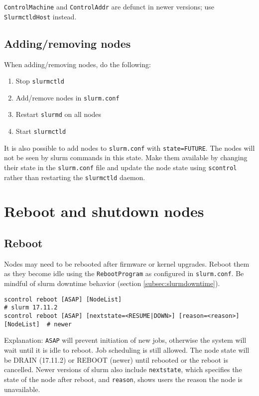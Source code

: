 \texttt{ControlMachine} and \texttt{ControlAddr} are defunct in newer versions; use \texttt{SlurmctldHost} instead.

\subsection{Adding/removing nodes} \label{subsec:addnodes}

When adding/removing nodes, do the following:
\begin{enumerate}
\item Stop \texttt{slurmctld}
\item Add/remove nodes in \texttt{slurm.conf}
\item Restart \texttt{slurmd} on all nodes
\item Start \texttt{slurmctld}
\end{enumerate}

\noindent It is also possible to add nodes to \texttt{slurm.conf} with \texttt{state=FUTURE}. The nodes will not be seen by slurm commands in this state. Make them available by changing their state in the \texttt{slurm.conf} file and update the node state using \texttt{scontrol} rather than restarting the \texttt{slurmctld} daemon.

\section{Reboot and shutdown nodes} \label{sec:slurmpowercycle}

\subsection{Reboot} \label{subsec:slurmreboot}

Nodes may need to be rebooted after firmware or kernel upgrades. Reboot them as they become idle using the \texttt{RebootProgram} as configured in \texttt{slurm.conf}. Be mindful of slurm downtime behavior (section \ref{subsec:slurmdowntime}).

\begin{verbatim}
scontrol reboot [ASAP] [NodeList]                                       # slurm 17.11.2
scontrol reboot [ASAP] [nextstate=<RESUME|DOWN>] [reason=<reason>] [NodeList]  # newer
\end{verbatim}

Explanation: \texttt{ASAP} will prevent initiation of new jobs, otherwise the system will wait until it is idle to reboot. Job scheduling is still allowed. The node state will be DRAIN (17.11.2) or REBOOT (newer) until rebooted or the reboot is cancelled. Newer versions of slurm also include \texttt{nextstate}, which specifies the state of the node after reboot, and \texttt{reason}, shows users the reason the node is unavailable.

